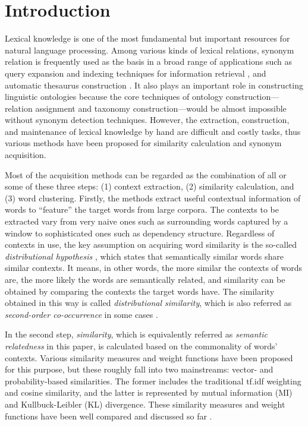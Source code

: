 \documentclass[english]{jnlp_1.4}
\begin{document}
\maketitle

\section{Introduction}


Lexical knowledge is one of the most fundamental but important
resources for natural language processing. Among various kinds of
lexical relations, synonym relation is frequently used as the basis in
a broad range of applications such as query expansion and indexing
techniques for information retrieval \cite{Crouch:92,Jing:94}, and
automatic thesaurus construction \cite{Kojima:95,Grefenstette:94}.  It
also plays an important role in constructing linguistic ontologies
because the core techniques of ontology construction---relation
assignment and taxonomy construction---would be almost impossible
without synonym detection techniques. However, the extraction,
construction, and maintenance of lexical knowledge by hand are
difficult and costly tasks, thus various methods
\cite{Hindle:90,Lin:98} have been proposed for similarity calculation
and synonym acquisition.

Most of the acquisition methods can be regarded as the combination of
all or some of these three steps: (1) context extraction, (2)
similarity calculation, and (3) word clustering. Firstly, the methods
extract useful contextual information of words to ``feature'' the
target words from large corpora. The contexts to be extracted vary
from very naive ones such as surrounding words captured by a window to
sophisticated ones such as dependency structure. Regardless of
contexts in use, the key assumption on acquiring word similarity is
the so-called {\it distributional hypothesis} \cite{Harris:85}, which
states that semantically similar words share similar contexts. It
means, in other words, the more similar the contexts of words are, the
more likely the words are semantically related, and similarity can be
obtained by comparing the contexts the target words have. The
similarity obtained in this way is called {\em distributional
similarity}, which is also referred as {\em second-order
co-occurrence} in some cases \cite{Picard:99}.

In the second step, {\em similarity}, which is equivalently referred
as {\em semantic relatedness} in this paper, is calculated based on
the commonality of words' contexts. Various similarity measures and
weight functions have been proposed for this purpose, but these
roughly fall into two mainstreams: vector- and probability-based
similarities. The former includes the traditional tf.idf weighting and
cosine similarity, and the latter is represented by mutual information
(MI) and Kullbuck-Leibler (KL) divergence. These similarity measures
and weight functions have been well compared and discussed so far
\cite{Chung:01,Curran:02:improvements}.
\end{document}

